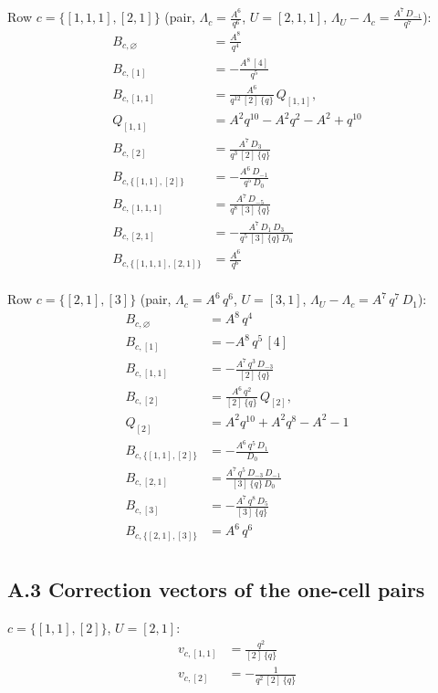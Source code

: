 \documentclass[11pt]{article}
\begin{document}
\noindent Row $c = \{[1,1,1],[2,1]\}$ (pair, $\Lambda_c = \frac{A^{6}}{q^{6}}$, $U = [2,1,1]$, $\Lambda_U - \Lambda_c = \frac{A^{7}\,D_{-1}}{q^{7}}$):
\begin{align*}
B_{c,\varnothing} &= \frac{A^{8}}{q^{4}} \\
B_{c,[1]} &= -\frac{A^{8}\,[4]}{q^{5}} \\
B_{c,[1,1]} &= \frac{A^{6}}{q^{12}\,[2]\,\{q\}}\,Q_{[1,1]}, \\
 Q_{[1,1]} &= A^{2}q^{10}-A^{2}q^{2}-A^{2}+q^{10} \\
B_{c,[2]} &= \frac{A^{7}\,D_{3}}{q^{3}\,[2]\,\{q\}} \\
B_{c,\{[1,1],[2]\}} &= -\frac{A^{6}\,D_{-1}}{q^{5}\,D_{0}} \\
B_{c,[1,1,1]} &= \frac{A^{7}\,D_{-5}}{q^{8}\,[3]\,\{q\}} \\
B_{c,[2,1]} &= -\frac{A^{7}\,D_{1}\,D_{3}}{q^{5}\,[3]\,\{q\}\,D_{0}} \\
B_{c,\{[1,1,1],[2,1]\}} &= \frac{A^{6}}{q^{6}} \\
\end{align*}

\noindent Row $c = \{[2,1],[3]\}$ (pair, $\Lambda_c = A^{6}\,q^{6}$, $U = [3,1]$, $\Lambda_U - \Lambda_c = A^{7}\,q^{7}\,D_{1}$):
\begin{align*}
B_{c,\varnothing} &= A^{8}\,q^{4} \\
B_{c,[1]} &= -A^{8}\,q^{5}\,[4] \\
B_{c,[1,1]} &= -\frac{A^{7}\,q^{3}\,D_{-3}}{[2]\,\{q\}} \\
B_{c,[2]} &= \frac{A^{6}\,q^{2}}{[2]\,\{q\}}\,Q_{[2]}, \\
 Q_{[2]} &= A^{2}q^{10}+A^{2}q^{8}-A^{2}-1 \\
B_{c,\{[1,1],[2]\}} &= -\frac{A^{6}\,q^{5}\,D_{1}}{D_{0}} \\
B_{c,[2,1]} &= \frac{A^{7}\,q^{5}\,D_{-3}\,D_{-1}}{[3]\,\{q\}\,D_{0}} \\
B_{c,[3]} &= -\frac{A^{7}\,q^{8}\,D_{5}}{[3]\,\{q\}} \\
B_{c,\{[2,1],[3]\}} &= A^{6}\,q^{6} \\
\end{align*}

\subsection*{A.3 Correction vectors of the one-cell pairs}
\noindent $c = \{[1,1],[2]\}$, $U = [2,1]$:
\begin{align*}
v_{c,[1,1]} &= \frac{q^{2}}{[2]\,\{q\}} \\
v_{c,[2]} &= -\frac{1}{q^{2}\,[2]\,\{q\}} \\
\end{align*}
\end{document}
